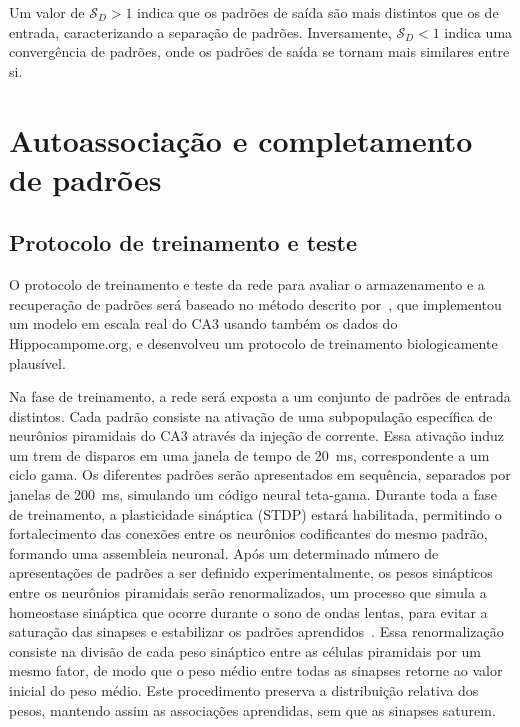 Um valor de $\mathcal{S}_D > 1$ indica que os padrões de saída são mais distintos que os de entrada, caracterizando a separação de padrões. Inversamente, $\mathcal{S}_D < 1$ indica uma convergência de padrões, onde os padrões de saída se tornam mais similares entre si.

\section{Autoassociação e completamento de padrões}

\subsection{Protocolo de treinamento e teste}\label{sec:protocolo_treinamento_teste}

O protocolo de treinamento e teste da rede para avaliar o armazenamento e a recuperação de padrões será baseado no método descrito
por~, que implementou um modelo em escala real do CA3 usando também os dados do Hippocampome.org,
e desenvolveu um protocolo de treinamento biologicamente plausível.

Na fase de treinamento, a rede será exposta a um conjunto de padrões de entrada distintos. Cada padrão consiste na ativação de uma
subpopulação específica de neurônios piramidais do CA3 através da injeção de corrente. Essa ativação induz um trem de disparos em
uma janela de tempo de \SI{20}{\milli\second}, correspondente a um ciclo gama. Os diferentes padrões serão apresentados em
sequência, separados por janelas de \SI{200}{\milli\second}, simulando um código neural teta-gama. Durante toda a fase de
treinamento, a plasticidade sináptica (STDP) estará habilitada, permitindo o fortalecimento das conexões entre os neurônios
codificantes do mesmo padrão, formando uma assembleia neuronal. Após um determinado número de apresentações de padrões a ser
definido experimentalmente, os pesos sinápticos entre os neurônios piramidais serão renormalizados, um processo que simula a
homeostase sináptica que ocorre durante o sono de ondas lentas, para evitar a saturação das sinapses e estabilizar os padrões
aprendidos~\cite{gonzalez-ruedaActivityDependent2018, kopsickFormation2024}. Essa renormalização consiste na divisão de cada peso
sináptico entre as células piramidais por um mesmo fator, de modo que o peso médio entre todas as sinapses retorne ao valor
inicial do peso médio. Este procedimento preserva a distribuição relativa dos pesos, mantendo assim as associações aprendidas, sem
que as sinapses saturem.

